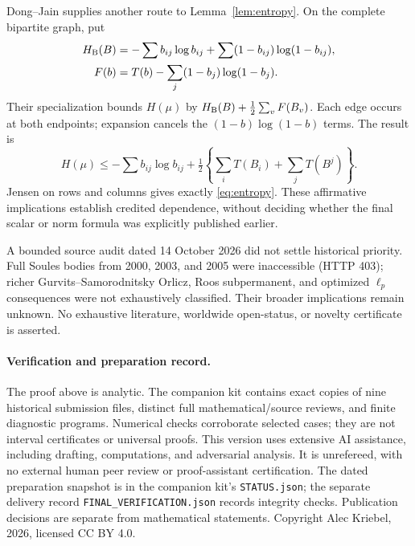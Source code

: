 \documentclass[11pt]{article}
\begin{document}
Dong--Jain \cite[\S3, Theorem~3.1, p.~9, $g=4$]{DJ} supplies another route to Lemma~\ref{lem:entropy}. On the complete bipartite graph, put
\begin{align*}
 H_{\rm B}(B)&=-\sum b_{ij}\log b_{ij}+\sum(1-b_{ij})\log(1-b_{ij}),\\
 F(b)&=T(b)-\sum_j(1-b_j)\log(1-b_j).
\end{align*}
Their specialization bounds $H(\mu)$ by $H_{\rm B}(B)+\frac12\sum_vF(B_v)$. Each edge occurs at both endpoints; expansion cancels the $(1-b)\log(1-b)$ terms. The result is
\[
 H(\mu)\le-\sum b_{ij}\log b_{ij}
   +\tfrac12\left\{\sum_iT(B_i)+\sum_jT(B^j)\right\}.
\]
Jensen on rows and columns gives exactly \eqref{eq:entropy}. These affirmative implications establish credited dependence, without deciding whether the final scalar or norm formula was explicitly published earlier.

A bounded source audit dated 14 October 2026 did not settle historical priority. Full Soules bodies from 2000, 2003, and 2005 were inaccessible (HTTP 403); richer Gurvits--Samorodnitsky Orlicz, Roos subpermanent, and optimized $\ell_p$ consequences were not exhaustively classified. Their broader implications remain unknown. No exhaustive literature, worldwide open-status, or novelty certificate is asserted.

\paragraph{Verification and preparation record.}
The proof above is analytic. The companion kit contains exact copies of nine historical submission files, distinct full mathematical/source reviews, and finite diagnostic programs. Numerical checks corroborate selected cases; they are not interval certificates or universal proofs. This version uses extensive AI assistance, including drafting, computations, and adversarial analysis. It is unrefereed, with no external human peer review or proof-assistant certification. The dated preparation snapshot is in the companion kit's \texttt{STATUS.json}; the separate delivery record \texttt{FINAL\_VERIFICATION.json} records integrity checks. Publication decisions are separate from mathematical statements. Copyright Alec Kriebel, 2026, licensed CC BY 4.0.
\end{document}
